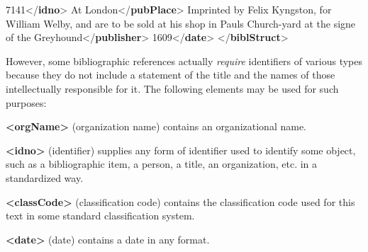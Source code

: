 \begin{shaded}
\hspace*{1em}7141{</\textbf{idno}>}\mbox{}\newline 
\hspace*{1em}\mbox{}\newline 
\hspace*{1em}\hspace*{1em}At London{</\textbf{pubPlace}>}\mbox{}\newline 
\hspace*{1em}\hspace*{1em}Imprinted by Felix Kyngston, for William Welby, and are to be sold at his shop in Pauls Church-yard at the signe of the Greyhound{</\textbf{publisher}>}\mbox{}\newline 
\hspace*{1em}\hspace*{1em}1609{</\textbf{date}>}\mbox{}\newline 
\hspace*{1em}\mbox{}\newline 
{}\mbox{}\newline 
{</\textbf{biblStruct}>}\end{shaded}\egroup\par \par
However, some bibliographic references actually \textit{require} identifiers of various types because they do not include a statement of the title and the names of those intellectually responsible for it. The following elements may be used for such purposes: 
\begin{sansreflist}
  
\item [\textbf{<orgName>}] (organization name) contains an organizational name.
\item [\textbf{<idno>}] (identifier) supplies any form of identifier used to identify some object, such as a bibliographic item, a person, a title, an organization, etc. in a standardized way.
\item [\textbf{<classCode>}] (classification code) contains the classification code used for this text in some standard classification system.
\item [\textbf{<date>}] (date) contains a date in any format.
\end{sansreflist}
